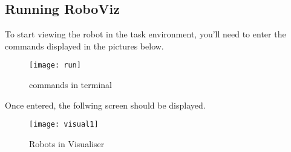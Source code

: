 \subsection{Running RoboViz}
\label{s:runningroboviz}

To start viewing the robot in the task environment, you'll need to enter the commands displayed in the pictures below.
\begin{figure}[htpb]
    \centering
    \texttt{[image: run]}
    \caption{commands in terminal }
    \label{fig:commands-in-terminal}
\end{figure}

Once entered, the follwing screen should be displayed.
\begin{figure}[htpb]
    \centering
    \texttt{[image: visual1]}
    \caption{Robots in Visualiser}
    \label{fig:robots-in-visualiser}
\end{figure}

